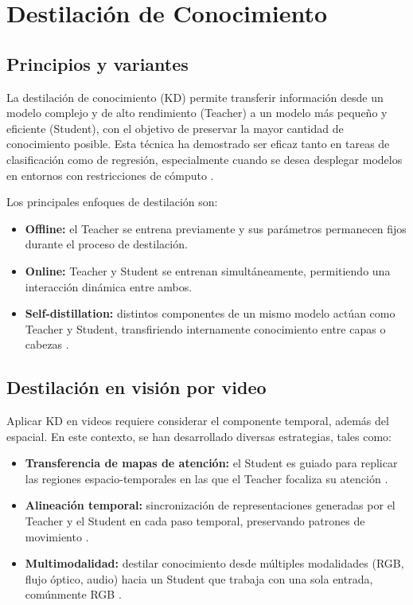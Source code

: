 \section{Destilación de Conocimiento}

\subsection{Principios y variantes}

La destilación de conocimiento (\ac{KD}) permite transferir información desde un modelo complejo y de alto rendimiento (Teacher) a un modelo más pequeño y eficiente (Student), con el objetivo de preservar la mayor cantidad de conocimiento posible. Esta técnica ha demostrado ser eficaz tanto en tareas de clasificación como de regresión, especialmente cuando se desea desplegar modelos en entornos con restricciones de cómputo \cite{Hinton2015Distilling}.

Los principales enfoques de destilación son:

\begin{itemize}
  \item \textbf{Offline:} el Teacher se entrena previamente y sus parámetros permanecen fijos durante el proceso de destilación.
  \item \textbf{Online:} Teacher y Student se entrenan simultáneamente, permitiendo una interacción dinámica entre ambos.
  \item \textbf{Self-distillation:} distintos componentes de un mismo modelo actúan como Teacher y Student, transfiriendo internamente conocimiento entre capas o cabezas \cite{Sarkar2022XKD}.
\end{itemize}

\subsection{Destilación en visión por video}

Aplicar \ac{KD} en videos requiere considerar el componente temporal, además del espacial. En este contexto, se han desarrollado diversas estrategias, tales como:

\begin{itemize}
  \item \textbf{Transferencia de mapas de atención:} el Student es guiado para replicar las regiones espacio-temporales en las que el Teacher focaliza su atención \cite{Yu2021GroupAware}.
  \item \textbf{Alineación temporal:} sincronización de representaciones generadas por el Teacher y el Student en cada paso temporal, preservando patrones de movimiento \cite{Mun2019TKD}.
  \item \textbf{Multimodalidad:} destilar conocimiento desde múltiples modalidades (RGB, flujo óptico, audio) hacia un Student que trabaja con una sola entrada, comúnmente RGB \cite{Cai2023VisionLanguageAQA}.
\end{itemize}

